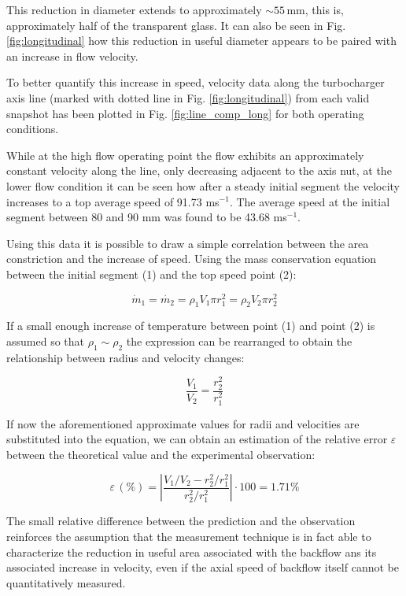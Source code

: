 This reduction in diameter extends to approximately $\sim 55\,$mm, this is, approximately half of the transparent glass. It can also be seen in Fig. \ref{fig:longitudinal} how this reduction in useful diameter appears to be paired with an increase in flow velocity. 

To better quantify this increase in speed, velocity data along the turbocharger axis line (marked with dotted line in Fig. \ref{fig:longitudinal}) from each valid snapshot has been plotted in Fig. \ref{fig:line_comp_long} for both operating conditions. 

While at the high flow operating point the flow exhibits an approximately constant velocity along the line, only decreasing adjacent to the axis nut, at the lower flow condition it can be seen how after a steady initial segment the velocity increases to a top average speed of 91.73 ms${}^{-1}$. The average speed at the initial segment between 80 and 90 mm was found to be 43.68 ms${}^{-1}$.

Using this data it is possible to draw a simple correlation between the area constriction and the increase of speed. Using the mass conservation equation between the initial segment (1) and the top speed point (2):

\begin{equation}
  \dot{m}_1 = \dot{m_2} = \rho_1 V_1 \pi r_1^2 = \rho_2 V_2 \pi r_2^2
\end{equation}

If a small enough increase of temperature between point (1) and point (2) is assumed so that $\rho_1\sim\rho_2$ the expression can be rearranged to obtain the relationship between radius and velocity changes:

\begin{equation}
  \frac{V_1}{V_2} = \frac{r_2^2}{r_1^2}
\end{equation}

If now the aforementioned approximate values for radii and velocities are substituted into the equation, we can obtain an estimation of the relative error $\varepsilon$ between the theoretical value and the experimental observation:

\begin{equation}
  \varepsilon\, (\%) = \left|\frac{V_1/V_2-r_2^2/r_1^2}{r_2^2/r_1^2}\right| \cdot 100 = 1.71\%
\end{equation}

The small relative difference between the prediction and the observation reinforces the assumption that the measurement technique is in fact able to characterize the reduction in useful area associated with the backflow ans its associated increase in velocity, even if the axial speed of backflow itself cannot be quantitatively measured.

